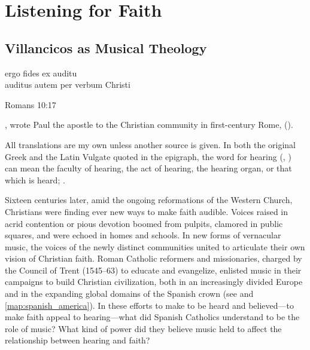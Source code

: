 
% 

\part{Listening for Faith}
\label{part:faith}

\chapter{Villancicos as Musical Theology}
\label{ch:intro}

\epigraph
{ergo fides ex auditu\\
auditus autem per verbum Christi}
{Romans 10:17}

, wrote Paul the apostle to the Christian
community in first-century Rome,  ().%
\begin{Footnote}
    All translations are my own unless another source is given.
    In both the original Greek and the Latin Vulgate quoted in the epigraph,
    the word for hearing (, ) can mean the
    faculty of hearing, the act of hearing, the hearing organ, or that which is
    heard; 
    \Autocite[]{BDAG}.
\end{Footnote}
Sixteen centuries later, amid the ongoing reformations of the Western Church,
Christians were finding ever new ways to make faith audible.
Voices raised in acrid contention or pious devotion boomed from pulpits,
clamored in public squares, and were echoed in homes and schools.  
In new forms of vernacular music, the voices of the newly distinct communities
united to articulate their own vision of Christian faith.
Roman Catholic reformers and missionaries, charged by the Council of Trent
(1545--63) to educate and evangelize, enlisted music in their campaigns to
build Christian civilization, both in an increasingly divided Europe and in the
expanding global domains of the Spanish crown (see  and
\ref{map:spanish_america}).
In these efforts to make  to be heard and
believed---to make faith appeal to hearing---what did Spanish Catholics
understand to be the role of music?
What kind of power did they believe music held to affect the relationship
between hearing and faith?

